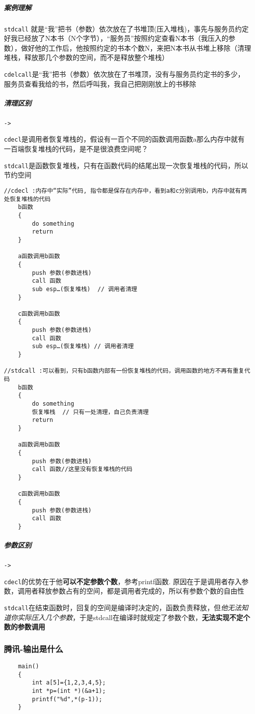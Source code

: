 \documentclass[UTF8,a4paper,8pt]{ctexart}
\begin{document}
			\subparagraph{案例理解}
				\verb|stdcall| 就是“我”把书（参数）依次放在了书堆顶(压入堆栈)，事先与服务员约定好我已经放了N本书（N个字节），“服务员”按照约定查看N本书（我压入的参数），做好他的工作后，他按照约定的书本个数N，来把N本书从书堆上移除（清理堆栈，释放那几个参数的空间，而不是释放整个堆栈）
				
				\verb|cdelcall|是“我”把书（参数）依次放在了书堆顶，没有与服务员约定书的多少，服务员查看我给的书，然后呼叫我，我自己把刚刚放上的书移除
				
			\subparagraph{清理区别}	\verb|->|
			
				\verb|cdecl|是调用者恢复堆栈的，假设有一百个不同的函数调用函数a那么内存中就有一百端恢复堆栈的代码，是不是很浪费空间呢？
				
				\verb|stdcall|是函数恢复堆栈，只有在函数代码的结尾出现一次恢复堆栈的代码，所以节约空间
					
				\begin{lstlisting}
//cdecl :内存中“实际”代码, 指令都是保存在内存中，看到a和c分别调用b，内存中就有两处恢复堆栈的代码
	b函数
	{
		do something
		return
	}
	
	a函数调用b函数
	{
		push 参数(参数进栈)
		call 函数
		sub esp…(恢复堆栈)	// 调用者清理
	}
	
	c函数调用b函数
	{
		push 参数(参数进栈)
		call 函数
		sub esp…(恢复堆栈) // 调用者清理
	}
	
//stdcall :可以看到，只有b函数内部有一份恢复堆栈的代码，调用函数的地方不再有重复代码
	b函数
	{
		do something
		恢复堆栈  // 只有一处清理，自己负责清理
		return
	}
	
	a函数调用b函数
	{
		push 参数(参数进栈)
		call 函数//这里没有恢复堆栈的代码
	}
	
	c函数调用b函数
	{
		push 参数(参数进栈)
		call 函数
	}
				\end{lstlisting}
		

		
			\subparagraph{参数区别}\verb|->|
			
				\verb|cdecl|的优势在于他\textbf{可以不定参数个数}，参考printf函数. 原因在于是调用者存入参数，调用者释放参数占有的空间，都是调用者完成的，所以有参数个数的自由性
			
				\verb|stdcall|在结束函数时，回复的空间是编译时决定的，函数负责释放，但\textit{他无法知道你实际压入几个参数}，于是stdcall在编译时就规定了参数个数，\textbf{无法实现不定个数的参数调用}
		
		\subsubsection{腾讯-输出是什么 }
		\begin{lstlisting}
	main()
	{
		int a[5]={1,2,3,4,5};
		int *p=(int *)(&a+1);
		printf("%d",*(p-1));
	}
		\end{lstlisting}
		
\end{document}
